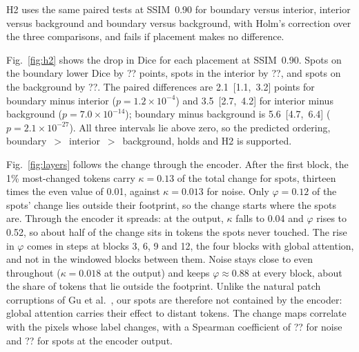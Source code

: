 H2 uses the same paired tests at SSIM~0.90 for boundary versus interior, interior versus background and boundary
versus background, with Holm's correction over the three comparisons, and fails if placement makes no difference.


Fig.~\ref{fig:h2} shows the drop in Dice for each placement at SSIM~0.90. Spots on the boundary lower Dice
by ?? points, spots in the interior by ??, and spots on the background by ??. The paired differences are
2.1~[1.1,~3.2] points for boundary minus interior ($p = 1.2\times10^{-4}$) and 3.5~[2.7,~4.2] for interior
minus background ($p = 7.0\times10^{-14}$); boundary minus background is 5.6~[4.7,~6.4] ($p = 2.1\times10^{-27}$).
All three intervals lie above zero, so the predicted ordering, boundary~$>$~interior~$>$~background, holds and
H2 is supported.


Fig.~\ref{fig:layers} follows the change through the encoder. After the first block, the 1\% most-changed
tokens carry $\kappa = 0.13$ of the total change for spots, thirteen times the even value of 0.01, against
$\kappa = 0.013$ for noise. Only $\varphi = 0.12$ of the spots' change lies outside their footprint, so the
change starts where the spots are. Through the encoder it spreads: at the output, $\kappa$ falls to 0.04 and
$\varphi$ rises to 0.52, so about half of the change sits in tokens the spots never touched. The rise in
$\varphi$ comes in steps at blocks 3, 6, 9 and 12, the four blocks with global attention, and not in the
windowed blocks between them. Noise stays close to even throughout ($\kappa = 0.018$ at the output) and keeps
$\varphi \approx 0.88$ at every block, about the share of tokens that lie outside the footprint. Unlike the
natural patch corruptions of Gu et al.~\cite{gu2022}, our spots are therefore not contained by the encoder:
global attention carries their effect to distant tokens. The change maps correlate with the pixels whose label
changes, with a Spearman coefficient of ?? for noise and ?? for spots at the encoder output.


